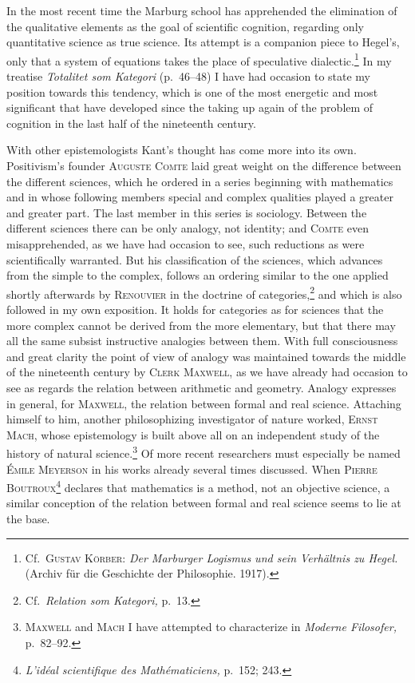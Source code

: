 \documentclass[12pt]{book}
\newcommand{\opage}[1]{\marginnote{\footnotesize\textit{[#1]}}}
\begin{document}
In the most recent time the Marburg school has apprehended the elimination of the
qualitative elements as the goal of scientific cognition, regarding only
quantitative science as true science. Its attempt is a companion piece to
Hegel's, only that a system of equations takes the place of speculative
dialectic.\footnote{Cf.\ \textsc{Gustav Körber:} \textit{Der Marburger Logismus
und sein Verhältnis zu Hegel.} (Archiv für die Geschichte der Philosophie. 1917).}
In my treatise \textit{Totalitet som Kategori} (p.\ 46--48) I have had occasion
to state my position towards this tendency, which is one of the most energetic
and most significant that have developed since the taking up again of the problem
of cognition in the last half of the nineteenth century.

With other epis\-te\-mol\-o\-gists Kant's thought has come more into its own. Pos\-i\-tiv\-ism's
founder \textsc{Auguste Comte} laid great weight on the difference between the
different sciences, which he ordered in a series beginning with mathematics and
in whose following members special and complex qualities played a greater and
greater part. The last member in this series is sociology. Between the different
sciences there can be only analogy, not identity; and \textsc{Comte} even
misapprehended, as we have had occasion to see, such reductions as were
scientifically warranted. But his classification of the sciences, which \opage{98}advances
from the simple to the complex, follows an ordering similar to the one applied
shortly afterwards by \textsc{Renouvier} in the doctrine of
categories,\footnote{Cf.\ \textit{Relation som Kategori,} p.\ 13.} and which is
also followed in my own exposition. It holds for categories as for sciences that
the more complex cannot be derived from the more elementary, but that there may
all the same subsist instructive analogies between them. With full consciousness
and great clarity the point of view of analogy was maintained towards the middle
of the nineteenth century by \textsc{Clerk Maxwell}, as we have already had
occasion to see as regards the relation between arithmetic and geometry. Analogy
expresses in general, for \textsc{Maxwell}, the relation between formal and real
science. Attaching himself to him, another philosophizing investigator of nature
worked, \textsc{Ernst Mach}, whose epistemology is built above all on an
independent study of the history of natural science.\footnote{\textsc{Maxwell}
and \textsc{Mach} I have attempted to characterize in \textit{Moderne Filosofer,}
p.\ 82--92.} Of more recent researchers must especially be named \textsc{Émile
Meyerson} in his works already several times discussed. When \textsc{Pierre
Boutroux}\footnote{\textit{L'idéal scientifique des Mathématiciens,} p.\ 152;
243.} declares that mathematics is a method, not an objective science, a similar
conception of the relation between formal and real science seems to lie at the
base.
\end{document}
